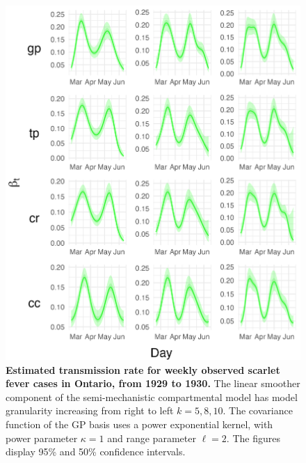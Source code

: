 \documentclass[
11pt, %
oneside, %
english, %
singlespacing, %
]{macthesis} %
\begin{document}
\begin{figure}[H]
\centering
\includegraphics[width=\textwidth, height = \textwidth]{figure/Scarlet/Scarlet_plot_gp(-2,2,1)_k(5,8,10)_gamma(014)_I0(100)_plot_beta.png}
\caption[Estimated Scarlet Fever Transmission Rate (1929-1930)]{\textbf{Estimated transmission rate for weekly observed scarlet fever cases in Ontario, from 1929 to 1930.} The linear smoother component of the semi-mechanistic compartmental model has model granularity increasing from right to left \(k= 5,8,10\). The covariance function of the GP basis uses a power exponential kernel, with power parameter \(\kappa = 1\) and range parameter \(\ell = 2\). The figures display 95\% and 50\% confidence intervals.}
\label{fig:scarlet_trans}
\end{figure}
\end{document}
